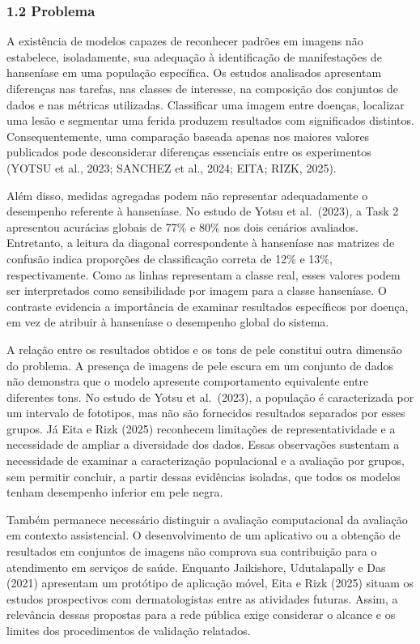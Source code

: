 \documentclass[
]{article}
\begin{document}
\subsubsection{1.2 Problema}\label{problema}

A existência de modelos capazes de reconhecer padrões em imagens não
estabelece, isoladamente, sua adequação à identificação de manifestações
de hanseníase em uma população específica. Os estudos analisados
apresentam diferenças nas tarefas, nas classes de interesse, na
composição dos conjuntos de dados e nas métricas utilizadas. Classificar
uma imagem entre doenças, localizar uma lesão e segmentar uma ferida
produzem resultados com significados distintos. Consequentemente, uma
comparação baseada apenas nos maiores valores publicados pode
desconsiderar diferenças essenciais entre os experimentos (YOTSU et al.,
2023; SANCHEZ et al., 2024; EITA; RIZK, 2025).

Além disso, medidas agregadas podem não representar adequadamente o
desempenho referente à hanseníase. No estudo de Yotsu et al.~(2023), a
Task 2 apresentou acurácias globais de 77\% e 80\% nos dois cenários
avaliados. Entretanto, a leitura da diagonal correspondente à hanseníase
nas matrizes de confusão indica proporções de classificação correta de
12\% e 13\%, respectivamente. Como as linhas representam a classe real,
esses valores podem ser interpretados como sensibilidade por imagem para
a classe hanseníase. O contraste evidencia a importância de examinar
resultados específicos por doença, em vez de atribuir à hanseníase o
desempenho global do sistema.

A relação entre os resultados obtidos e os tons de pele constitui outra
dimensão do problema. A presença de imagens de pele escura em um
conjunto de dados não demonstra que o modelo apresente comportamento
equivalente entre diferentes tons. No estudo de Yotsu et al.~(2023), a
população é caracterizada por um intervalo de fototipos, mas não são
fornecidos resultados separados por esses grupos. Já Eita e Rizk (2025)
reconhecem limitações de representatividade e a necessidade de ampliar a
diversidade dos dados. Essas observações sustentam a necessidade de
examinar a caracterização populacional e a avaliação por grupos, sem
permitir concluir, a partir dessas evidências isoladas, que todos os
modelos tenham desempenho inferior em pele negra.

Também permanece necessário distinguir a avaliação computacional da
avaliação em contexto assistencial. O desenvolvimento de um aplicativo
ou a obtenção de resultados em conjuntos de imagens não comprova sua
contribuição para o atendimento em serviços de saúde. Enquanto
Jaikishore, Udutalapally e Das (2021) apresentam um protótipo de
aplicação móvel, Eita e Rizk (2025) situam os estudos prospectivos com
dermatologistas entre as atividades futuras. Assim, a relevância dessas
propostas para a rede pública exige considerar o alcance e os limites
dos procedimentos de validação relatados.
\end{document}
